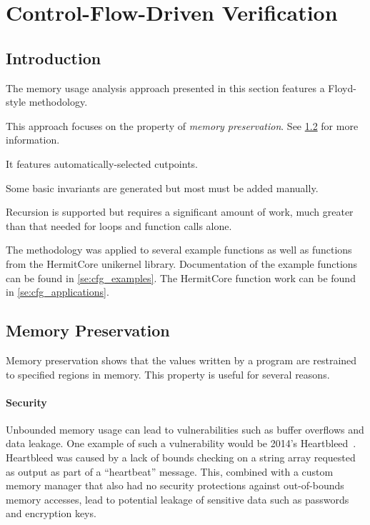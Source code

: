 \chapter{Control-Flow-Driven Verification}

\section{Introduction}\label{se:cfg_intro}
The memory usage analysis approach presented in this section features a Floyd-style methodology.

This approach focuses on the property of \emph{memory preservation}.
See \cref{se:memory_preservation} for more information.

It features automatically-selected cutpoints.

Some basic invariants are generated but most must be added manually.

Recursion is supported but requires a significant amount of work,
much greater than that needed for loops and function calls alone.

The methodology was applied to several example functions
as well as functions from the HermitCore unikernel library.
Documentation of the example functions can be found in \cref{se:cfg_examples}.
The HermitCore function work can be found in \cref{se:cfg_applications}.

\section{Memory Preservation}\label{se:memory_preservation}
Memory preservation shows that the values written by a program
are restrained to specified regions in memory.
This property is useful for several reasons.

\subsubsection{Security}
Unbounded memory usage can lead to vulnerabilities
such as buffer overflows and data leakage.
One example of such a vulnerability would be 2014's Heartbleed~\citep{heartbleed}.
Heartbleed was caused by a lack of bounds checking on a string array
requested as output as part of a ``heartbeat'' message.
This, combined with a custom memory manager
that also had no security protections against out-of-bounds memory accesses,
lead to potential leakage of sensitive data such as passwords and encryption keys.

